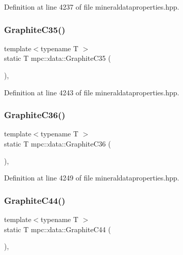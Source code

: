 Definition at line 4237 of file mineraldataproperties.\+hpp.

\mbox{\label{namespacempc_1_1data_a04230c73f219d33fa44bf8178e66a867}} 
\subsubsection{\texorpdfstring{Graphite\+C35()}{GraphiteC35()}}
{\footnotesize\ttfamily template$<$typename T $>$ \\
static T mpc\+::data\+::\+Graphite\+C35 (\begin{DoxyParamCaption}{ }\end{DoxyParamCaption})\hspace{0.3cm}{\ttfamily [inline]}, {\ttfamily [static]}}



Definition at line 4243 of file mineraldataproperties.\+hpp.

\mbox{\label{namespacempc_1_1data_ab3b5e78d5e1450703649dd9da0454142}} 
\subsubsection{\texorpdfstring{Graphite\+C36()}{GraphiteC36()}}
{\footnotesize\ttfamily template$<$typename T $>$ \\
static T mpc\+::data\+::\+Graphite\+C36 (\begin{DoxyParamCaption}{ }\end{DoxyParamCaption})\hspace{0.3cm}{\ttfamily [inline]}, {\ttfamily [static]}}



Definition at line 4249 of file mineraldataproperties.\+hpp.

\mbox{\label{namespacempc_1_1data_a9f8078dc5ecdf1e60790dc571a86ef1c}} 
\subsubsection{\texorpdfstring{Graphite\+C44()}{GraphiteC44()}}
{\footnotesize\ttfamily template$<$typename T $>$ \\
static T mpc\+::data\+::\+Graphite\+C44 (\begin{DoxyParamCaption}{ }\end{DoxyParamCaption})\hspace{0.3cm}{\ttfamily [inline]}, {\ttfamily [static]}}



